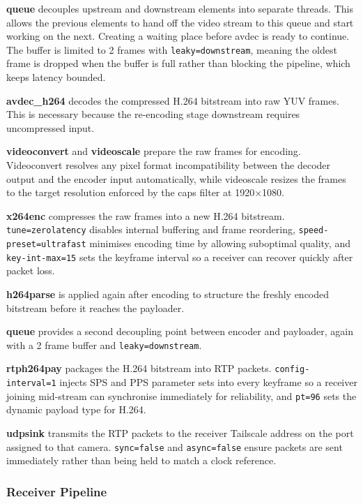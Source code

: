 \textbf{queue} decouples upstream and downstream elements into separate threads. This allows the previous elements to hand off the video stream to this queue and start working on the next. Creating a waiting place before avdec is ready to continue. The buffer is limited to 2 frames with \texttt{leaky=downstream}, meaning the oldest frame is dropped when the buffer is full rather than blocking the pipeline, which keeps latency bounded.

\textbf{avdec\_h264} decodes the compressed H.264 bitstream into raw YUV frames. This is necessary because the re-encoding stage downstream requires uncompressed input.

\textbf{videoconvert} and \textbf{videoscale} prepare the raw frames for encoding. Videoconvert resolves any pixel format incompatibility between the decoder output and the encoder input automatically, while videoscale resizes the frames to the target resolution enforced by the caps filter at 1920$\times$1080.

\textbf{x264enc} compresses the raw frames into a new H.264 bitstream. \texttt{tune=zerolatency} disables internal buffering and frame reordering, \texttt{speed-preset=ultrafast} minimises encoding time by allowing suboptimal quality, and \texttt{key-int-max=15} sets the keyframe interval so a receiver can recover quickly after packet loss.

\textbf{h264parse} is applied again after encoding to structure the freshly encoded bitstream before it reaches the payloader.

\textbf{queue} provides a second decoupling point between encoder and payloader, again with a 2 frame buffer and \texttt{leaky=downstream}.

\textbf{rtph264pay} packages the H.264 bitstream into RTP packets. \texttt{config-interval=1} injects SPS and PPS parameter sets into every keyframe so a receiver joining mid-stream can synchronise immediately for reliability, and \texttt{pt=96} sets the dynamic payload type for H.264.

\textbf{udpsink} transmits the RTP packets to the receiver Tailscale address on the port assigned to that camera. \texttt{sync=false} and \texttt{async=false} ensure packets are sent immediately rather than being held to match a clock reference.

\subsubsection{Receiver Pipeline}

